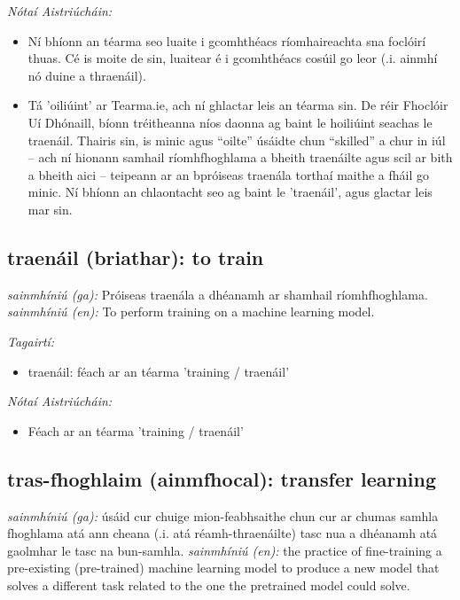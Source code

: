 \documentclass{article}
\begin{document}
 \noindent \textit{Nótaí Aistriúcháin:}
\begin{itemize}
	\item Ní bhíonn an téarma seo luaite i gcomhthéacs ríomhaireachta sna foclóirí thuas. Cé is moite de sin, luaitear é i gcomhthéacs cosúil go leor (.i. ainmhí nó duine a thraenáil).
	\item Tá 'oiliúint' ar Tearma.ie, ach ní ghlactar leis an téarma sin. De réir Fhoclóir Uí Dhónaill, bíonn tréitheanna níos daonna ag baint le hoiliúint seachas le traenáil. Thairis sin, is minic agus “oilte” úsáidte chun “skilled” a chur in iúl -- ach ní hionann samhail ríomhfhoghlama a bheith traenáilte agus scil ar bith a bheith aici -- teipeann ar an bpróiseas traenála torthaí maithe a fháil go minic. Ní bhíonn an chlaontacht seo ag baint le 'traenáil', agus glactar leis mar sin.
\end{itemize}


\subsection*{traenáil (briathar): to train} 
 \noindent \textit{sainmhíniú (ga):} Próiseas traenála a dhéanamh ar shamhail ríomhfhoghlama.
\newline\newline
 \noindent \textit{sainmhíniú (en):} To perform training on a machine learning model.
\newline

 \noindent \textit{Tagairtí:}
\begin{itemize}
	\item traenáil: féach ar an téarma 'training / traenáil'
\end{itemize}

 \noindent \textit{Nótaí Aistriúcháin:}
\begin{itemize}
	\item Féach ar an téarma 'training / traenáil'
\end{itemize}


\subsection*{tras-fhoghlaim (ainmfhocal): transfer learning} 
 \noindent \textit{sainmhíniú (ga):} úsáid cur chuige mion-feabhsaithe chun cur ar chumas samhla fhoghlama atá ann cheana (.i. atá réamh-thraenáilte) tasc nua a dhéanamh atá gaolmhar le tasc na bun-samhla.
\newline\newline
 \noindent \textit{sainmhíniú (en):} the practice of fine-training a pre-existing (pre-trained) machine learning model to produce a new model that solves a different task related to the one the pretrained model could solve.
\newline
\end{document}
